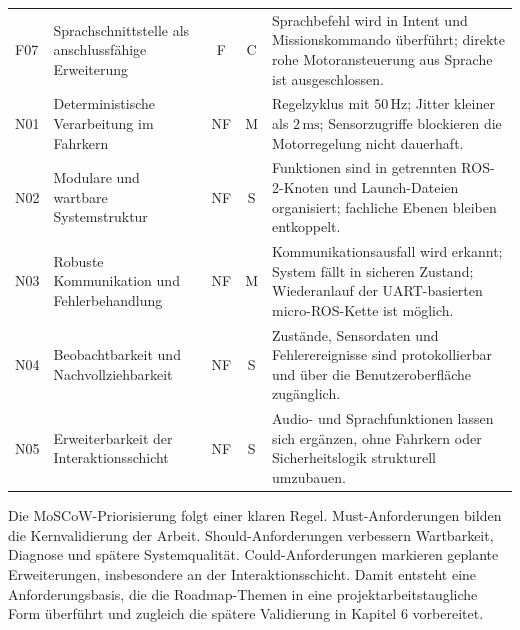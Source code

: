 \begin{table}[htbp]
\begin{tabularx}{\textwidth}{l L c c L}
    \addlinespace
    F07 & Sprachschnittstelle als anschlussfähige Erweiterung & F & C & Sprachbefehl wird in Intent und Missionskommando überführt; direkte rohe Motoransteuerung aus Sprache ist ausgeschlossen. \\
    \addlinespace
    N01 & Deterministische Verarbeitung im Fahrkern & NF & M & Regelzyklus mit $50\,\mathrm{Hz}$; Jitter kleiner als $2\,\mathrm{ms}$; Sensorzugriffe blockieren die Motorregelung nicht dauerhaft. \\
    \addlinespace
    N02 & Modulare und wartbare Systemstruktur & NF & S & Funktionen sind in getrennten ROS-2-Knoten und Launch-Dateien organisiert; fachliche Ebenen bleiben entkoppelt. \\
    \addlinespace
    N03 & Robuste Kommunikation und Fehlerbehandlung & NF & M & Kommunikationsausfall wird erkannt; System fällt in sicheren Zustand; Wiederanlauf der UART-basierten micro-ROS-Kette ist möglich. \\
    \addlinespace
    N04 & Beobachtbarkeit und Nachvollziehbarkeit & NF & S & Zustände, Sensordaten und Fehlerereignisse sind protokollierbar und über die Benutzeroberfläche zugänglich. \\
    \addlinespace
    N05 & Erweiterbarkeit der Interaktionsschicht & NF & S & Audio- und Sprachfunktionen lassen sich ergänzen, ohne Fahrkern oder Sicherheitslogik strukturell umzubauen. \\
    \bottomrule
  \end{tabularx}
\end{table}

Die MoSCoW-Priorisierung folgt einer klaren Regel. Must-Anforderungen bilden die Kernvalidierung der Arbeit. Should-Anforderungen verbessern Wartbarkeit, Diagnose und spätere Systemqualität. Could-Anforderungen markieren geplante Erweiterungen, insbesondere an der Interaktionsschicht. Damit entsteht eine Anforderungsbasis, die die Roadmap-Themen in eine projektarbeitstaugliche Form überführt und zugleich die spätere Validierung in Kapitel 6 vorbereitet.

